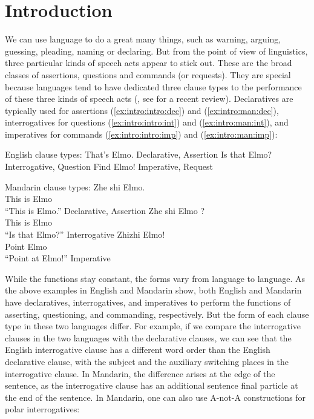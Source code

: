 \chapter{Introduction}
\label{chap:introduction}

We can use language to do a great many things, such as warning, arguing, guessing, pleading, naming or declaring. But from the point of view of linguistics, three particular kinds of speech acts appear to stick out.
These are the broad classes of assertions, questions and commands (or requests). They are special because
languages tend to have dedicated three clause types to the performance of these three kinds of speech acts (\citealt{sz1985speechact, konig2007, aikhenvald2016, portner2018}, see \cite{konig2020} for a recent review). Declaratives are typically used for assertions (\ref{ex:intro:intro:dec}) and (\ref{ex:intro:man:dec}), interrogatives for questions (\ref{ex:intro:intro:int}) and (\ref{ex:intro:man:int}), and imperatives for commands (\ref{ex:intro:intro:imp}) and (\ref{ex:intro:man:imp}):

English clause types:
\bxl \label{ex:intro:intro:dec}
That's Elmo. \hfill Declarative, Assertion
\ex\label{ex:intro:intro:int} Is that Elmo? \hfill Interrogative, Question
\ex\label{ex:intro:intro:imp} Find Elmo! \hfill Imperative, Request
\exl
\eex

Mandarin clause types:
\bxl \label{ex:intro:man:dec}
\gll Zhe shi Elmo.\\
This is Elmo\\
\trans ``This is Elmo.'' \hfill Declarative, Assertion
\ex \label{ex:intro:man:int}
\gll Zhe shi Elmo ?\\
This is Elmo \Sfp\\
\trans ``Is that Elmo?'' \hfill Interrogative
\ex \label{ex:intro:man:imp}
\gll Zhizhi Elmo!\\
Point Elmo\\
\trans ``Point at Elmo!'' \hfill Imperative
\exl
\eex

While the functions stay constant, the forms vary from language to language. As the above examples in English and Mandarin show,  both English and Mandarin have declaratives, interrogatives, and imperatives to perform the functions of asserting, questioning, and commanding, respectively. But the form of each clause type in these two languages differ. For example, if we compare the interrogative clauses in the two languages with the declarative clauses, we can see that the English interrogative clause has a different word order than the English declarative clause, with the subject and the auxiliary switching places in the interrogative clause. In Mandarin, the difference arises at the edge of the sentence, as the interrogative clause has an additional sentence final particle  at the end of the sentence. In Mandarin, one can also use A-not-A constructions for polar interrogatives:

